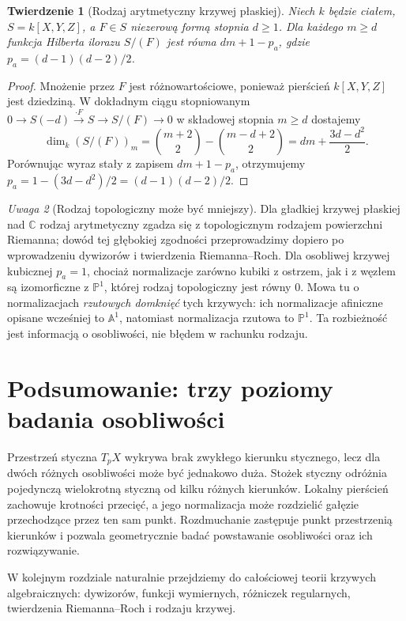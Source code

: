 \documentclass[11pt,a4paper,openany]{report}
\numberwithin{equation}{section}
\theoremstyle{plain}
\newtheorem{twierdzenie}{Twierdzenie}[section]
\theoremstyle{definition}
\theoremstyle{remark}
\newtheorem{uwaga}[twierdzenie]{Uwaga}
\newcommand{\C}{\mathbb C}
\newcommand{\A}{\mathbb A}
\newcommand{\PP}{\mathbb P}
\begin{document}
\begin{twierdzenie}[Rodzaj arytmetyczny krzywej płaskiej]
\label{tw:arithmetic-genus-plane}
Niech $k$ będzie ciałem, $S=k[X,Y,Z]$, a $F\in S$
niezerową formą stopnia $d\ge1$. Dla każdego $m\ge d$
funkcja Hilberta ilorazu $S/(F)$ jest równa $dm+1-p_a$,
gdzie $p_a=(d-1)(d-2)/2$.
\end{twierdzenie}
\begin{proof}
Mnożenie przez $F$ jest różnowartościowe,
ponieważ pierścień $k[X,Y,Z]$ jest dziedziną.
W dokładnym ciągu stopniowanym
$0\to S(-d)\xrightarrow{\cdot F}S\to S/(F)\to0$
w składowej stopnia $m\ge d$ dostajemy
\[
 \dim_k(S/(F))_m=\binom{m+2}{2}-\binom{m-d+2}{2}
 =dm+\frac{3d-d^2}{2}.
\]
Porównując wyraz stały z zapisem $dm+1-p_a$,
otrzymujemy $p_a=1-(3d-d^2)/2=(d-1)(d-2)/2$.
\end{proof}

\begin{uwaga}[Rodzaj topologiczny może być mniejszy]
Dla gładkiej krzywej płaskiej nad $\C$ rodzaj
arytmetyczny zgadza się z topologicznym rodzajem
powierzchni Riemanna; dowód tej głębokiej zgodności
przeprowadzimy dopiero po wprowadzeniu dywizorów
i twierdzenia Riemanna--Roch. Dla osobliwej krzywej
kubicznej $p_a=1$, chociaż normalizacje zarówno
kubiki z ostrzem, jak i z węzłem są izomorficzne
z $\PP^1$, której rodzaj topologiczny jest równy $0$.
Mowa tu o normalizacjach \emph{rzutowych domknięć}
tych krzywych: ich normalizacje afiniczne opisane wcześniej
to $\A^1$, natomiast normalizacja rzutowa to $\PP^1$.
Ta rozbieżność jest informacją o osobliwości, nie błędem
w rachunku rodzaju.
\end{uwaga}

\section{Podsumowanie: trzy poziomy badania osobliwości}

Przestrzeń styczna $T_pX$ wykrywa brak zwykłego kierunku
stycznego, lecz dla dwóch różnych osobliwości może być
jednakowo duża. Stożek styczny odróżnia pojedynczą
wielokrotną styczną od kilku różnych kierunków.
Lokalny pierścień zachowuje krotności przecięć, a jego
normalizacja może rozdzielić gałęzie przechodzące przez
ten sam punkt. Rozdmuchanie zastępuje punkt przestrzenią
kierunków i pozwala geometrycznie badać powstawanie
osobliwości oraz ich rozwiązywanie.

W kolejnym rozdziale naturalnie przejdziemy do
całościowej teorii krzywych algebraicznych:
dywizorów, funkcji wymiernych, różniczek regularnych,
twierdzenia Riemanna--Roch i rodzaju krzywej.
\end{document}
